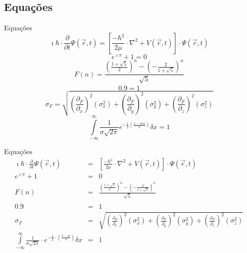     \subsection{Equações}
    \begin{frame}{Equações }
        \begin{equation*}
            \imath\hbar\cdot\frac{\partial}{\partial t}\Psi\left(\vec{r},t\right) = \left[\frac{-\hbar^2}{2\mu}\cdot\nabla^2 + V\left(\vec{r},t\right)\right]\cdot\Psi\left(\vec{r},t\right)
        \end{equation*}
        \begin{equation*}
            e^{\imath\pi}+1=0
        \end{equation*}
        \begin{equation*}
            F(n)=\frac{\left(\frac{1+\sqrt{5}}{2}\right)^n-\left(-\frac{2}{1+\sqrt{5}}\right)^n}{\sqrt{5}}
        \end{equation*}
        \begin{equation*}
            0.\Dot{9}=1
        \end{equation*}
        \begin{equation*}
            \sigma_F = \sqrt{\left(\frac{\partial_F}{\partial_x}\right)^2(\sigma_x^2) + \left(\frac{\partial_F}{\partial_y}\right)^2(\sigma_y^2) + \left(\frac{\partial_F}{\partial_z}\right)^2(\sigma_z^2)}
        \end{equation*}
        \begin{equation*}
            \overset{\infty}{\underset{-\infty}{\int}} \frac{1}{\sigma\sqrt{2\pi}}e^{-\frac{1}{2}\left(\frac{x-mu}{\sigma}\right)} \delta x = 1
        \end{equation*}
    \end{frame}

    \begin{frame}{Equações}
        \begin{eqnarray}
            \nonumber \imath\hbar\cdot\frac{\partial}{\partial t}\Psi\left(\vec{r},t\right) & = & \left[\frac{-\hbar^2}{2\mu}\cdot\nabla^2 + V\left(\vec{r},t\right)\right]\cdot\Psi\left(\vec{r},t\right)\\
            \nonumber e^{\imath\pi}+1 & = & 0\\
            \nonumber F(n) & = & \frac{\left(\frac{1+\sqrt{5}}{2}\right)^n-\left(-\frac{2}{1+\sqrt{5}}\right)^n}{\sqrt{5}}\\
            \nonumber 0.\Dot{9} & = & 1\\
            \nonumber \sigma_F & = & \sqrt{\left(\frac{\partial_F}{\partial_x}\right)^2(\sigma_x^2) + \left(\frac{\partial_F}{\partial_y}\right)^2(\sigma_y^2) + \left(\frac{\partial_F}{\partial_z}\right)^2(\sigma_z^2)}\\
            \nonumber \overset{\infty}{\underset{-\infty}{\int}} \frac{1}{\sigma\sqrt{2\pi}} \cdot e^{-\frac{1}{2} \cdot \left(\frac{x-\mu}{\sigma}\right)} \delta x & = & 1
        \end{eqnarray}
    \end{frame}

